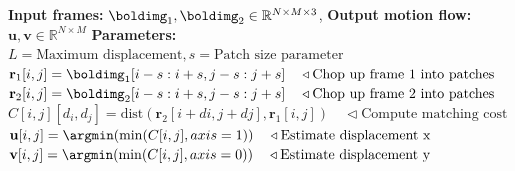 \begin{algorithm}[h]
    \SetAlgoVlined
    \DontPrintSemicolon
    \caption{{\bf Algorithm \ref{alg:motion_matching_algorithm}}: Patch matching motion estimation. The algorithm starts by chopping the two frames into overlapping patches. Then, for every patch from the first frame, we compute the distance to all the nearby patches in frame 2. Finally, for each input patch we select the closest patch from frame 2 and we record the relative displacement between the two patches. The pseudocode can be rearranged to be more memory efficient.}
    \fakealgorithmcaption{}
    \label{alg:motion_matching_algorithm}
    {\bf Input frames:} $\boldimg_1, \boldimg_2 \in \mathbb{R}^{N \times M \times 3}$,
    {\bf Output motion flow:} $\mathbf{u}, \mathbf{v} \in \mathbb{R}^{N \times M}$\;
    {\bf Parameters:} $L = \text{Maximum displacement}, s = \text{Patch size parameter}$\;
    {
    {
    $\mathbf{r}_1[i,j] = \boldimg_1 [i-s:i+s, j-s:j+s] \quad \triangleleft \text{Chop up frame 1 into patches}$\;
    $\mathbf{r}_2[i,j] = \boldimg_2 [i-s:i+s, j-s:j+s] \quad \triangleleft \text{Chop up frame 2 into patches}$\;
    }
    }
    {
        {
            {
                {
                    $C[i,j][d_i,d_j] = \text{dist}(\mathbf{r}_2[i+di,j+dj], \mathbf{r}_1[i,j])
                        \quad \triangleleft \text{Compute matching cost}$\;
                }
            }
        }
    }
    {
        {
            $\mathbf{u}[i,j] = \argmin (\min (C[i,j], axis=1)) \quad \triangleleft \text{Estimate  displacement x}$\;
            $\mathbf{v}[i,j] = \argmin (\min (C[i,j], axis=0)) \quad \triangleleft \text{Estimate  displacement y}$\;
        }
    }
\end{algorithm}


